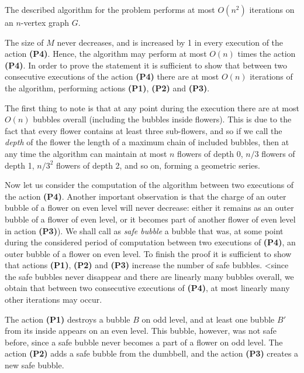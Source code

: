 \begin{lema}
  The described algorithm for the \minfactor problem performs at most $O(n^2)$ iterations on an $n$-vertex graph $G$.
\end{lema}
\begin{dokaz}
  The size of $M$ never decreases, and is increased by 1 in every execution of the action {\bf (P4)}.
  Hence, the algorithm may perform at most $O(n)$ times the action  {\bf (P4)}. In order to prove the statement
  it is sufficient to show that between two consecutive executions of the action {\bf (P4)} there are at most
  $O(n)$ iterations of the algorithm, performing actions  {\bf (P1)}, {\bf (P2)} and {\bf (P3)}.


\noindent
  The first thing to note is that at any point during the execution there are at most $O(n)$ bubbles
  overall (including the bubbles inside flowers). This is due to the fact that every flower contains at least three
  sub-flowers, and so if we call the {\em depth} of the flower the length of a maximum chain of included bubbles,
  then at any time the algorithm can maintain at most $n$ flowers of depth 0, $n/3$ flowers of depth 1, $n/3^2$
  flowers of depth 2, and so on, forming a geometric series.


\noindent
 Now let us consider the computation of the algorithm between two executions of the action  {\bf (P4)}.
 Another important observation is that the charge of an outer bubble of a flower on even level will never decrease:
 either it remains as an outer bubble of a flower of even level, or it becomes part of another flower
 of even level in action  {\bf(P3)}).  We shall call as {\em safe bubble} a bubble that was, at some point
 during the considered period of computation between two executions of  {\bf (P4)}, an outer bubble
 of a flower on even level. To finish the proof it is sufficient to show that actions  {\bf (P1)}, {\bf (P2)} and
 {\bf (P3)} increase the number of safe bubbles. <since the safe bubbles never disappear and there are linearly 
 many bubbles overall, we obtain that between two consecutive executions of  {\bf (P4)}, at most linearly many
 other iterations may occur. 


 \noindent
 The action  {\bf (P1)} destroys a bubble $B$ on odd level, and at least one bubble $B'$ from its inside
 appears on an even level. This bubble, however, was not safe before, since a safe bubble never becomes a part
 of a flower on odd level. The action  {\bf (P2)} adds a safe bubble from the dumbbell, and the action
 {\bf (P3)}  creates a new safe bubble.
\end{dokaz}


